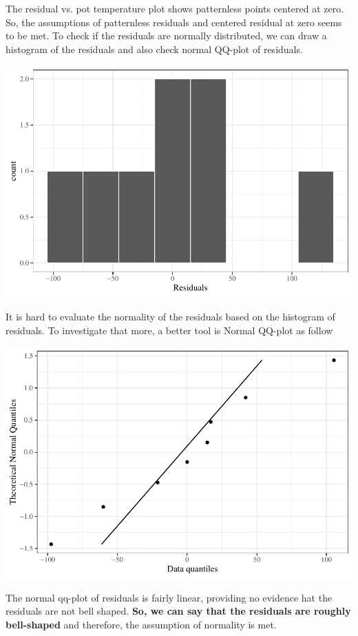 \documentclass[11pt]{article}\usepackage[]{graphicx}\usepackage[]{color}
\begin{document}
\begin{enumerate}
\begin{enumerate}
 The residual vs. pot temperature plot shows patternless points centered at zero. So, the assumptions of patternless residuals and centered residual at zero seems to be met. To check if the residuals are normally distributed, we can draw a histogram of the residuals and also check normal QQ-plot of residuals. 
 
\includegraphics{stat305-hw4_sol-006}
 
    It is hard to evaluate the normality of the residuals based on the  histogram of residuals.  To investigate that more, a better tool is Normal QQ-plot as follow
    
\includegraphics{stat305-hw4_sol-007}
    

 
    The normal qq-plot of residuals is fairly linear, providing no  evidence hat the residuals are not bell shaped. \textbf{So, we can say that the residuals are roughly bell-shaped} and therefore, the assumption of normality is met. 


\end{enumerate}
\end{enumerate}
\end{document}
